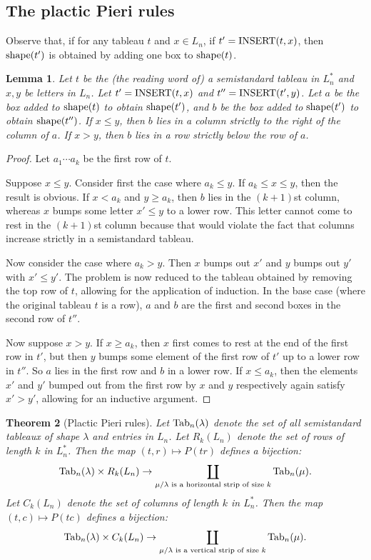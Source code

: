 \documentclass[11pt]{amsproc}
\newtheorem{theorem}{Theorem}[subsection]
\newtheorem{lemma}[theorem]{Lemma}
\theoremstyle{definition}
\theoremstyle{example}
\newcommand{\ins}{\textup{INSERT}}
\newcommand{\shape}{\textup{shape}}
\newcommand{\Tab}{\textup{Tab}}
\begin{document}
\subsection{The plactic Pieri rules}
Observe that, if for any tableau $t$ and $x\in L_n$, if $t'=\ins(t,x)$, then $\shape(t')$ is obtained by adding one box to $\shape(t)$.
\begin{lemma}
  \label{lemma:two-step}
  Let $t$ be the (the reading word of) a semistandard tableau in $L_n^*$ and $x,y$ be letters in $L_n$.
  Let $t'=\ins(t,x)$ and $t''=\ins(t',y)$.
  Let $a$ be the box added to $\shape(t)$ to obtain $\shape(t')$, and $b$ be the box added to $\shape(t')$ to obtain $\shape(t'')$.
  If $x\leq y$, then $b$ lies in a column strictly to the right of the column of $a$.
  If $x>y$, then $b$ lies in a row strictly below the row of $a$.
\end{lemma}
\begin{proof}
  Let $a_1\dotsb a_k$ be the first row of $t$.

  Suppose $x\leq y$.
  Consider first the case where $a_k\leq y$.
  If $a_k\leq x\leq y$, then the result is obvious.
  If $x<a_k$ and $y\geq a_k$, then $b$ lies in the $(k+1)$st column, whereas $x$ bumps some letter $x'\leq y$ to a lower row.
  This letter cannot come to rest in the $(k+1)$st column because that would violate the fact that columns increase strictly in a semistandard tableau.

  Now consider the case where $a_k>y$.
  Then $x$ bumps out $x'$ and $y$ bumps out $y'$ with $x'\leq y'$.
  The problem is now reduced to the tableau obtained by removing the top row of $t$, allowing for the application of induction.
  In the base case (where the original tableau $t$ is a row), $a$ and $b$ are the first and second boxes in the second row of $t''$.

  Now suppose $x>y$.
  If $x\geq a_k$, then $x$ first comes to rest at the end of the first row in $t'$, but then $y$ bumps some element of the first row of $t'$ up to a lower row in $t''$.
  So $a$ lies in the first row and $b$ in a lower row.
  If $x\leq a_k$, then the elements $x'$ and $y'$ bumped out from the first row by $x$ and $y$ respectively again satisfy $x'>y'$, allowing for an inductive argument.
\end{proof}
\begin{theorem}
  [Plactic Pieri rules]
  \label{theorem:plactic-pieri}
  Let $\Tab_n(\lambda)$ denote the set of all semistandard tableaux of shape $\lambda$ and entries in $L_n$.
  Let $R_k(L_n)$ denote the set of rows of length $k$ in $L_n^*$.
  Then the map $(t,r)\mapsto P(tr)$ defines a bijection:
  \begin{displaymath}
    \Tab_n(\lambda)\times R_k(L_n) \to \coprod_{\mu/\lambda \text{ is a horizontal strip of size $k$}} \Tab_n(\mu).
  \end{displaymath}
  Let $C_k(L_n)$ denote the set of columns of length $k$ in $L_n^*$.
  Then the map $(t,c)\mapsto P(tc)$ defines a bijection:
  \begin{displaymath}
    \Tab_n(\lambda)\times C_k(L_n) \to \coprod_{\mu/\lambda \text{ is a vertical strip of size $k$}} \Tab_n(\mu).
  \end{displaymath}
\end{theorem}
\end{document}
